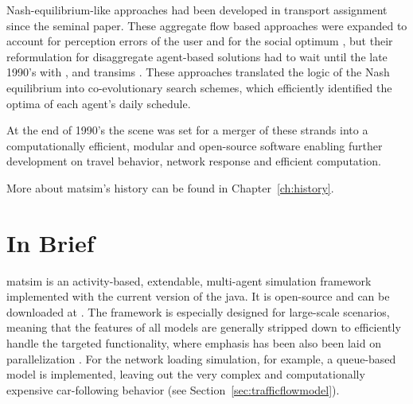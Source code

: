 



Nash-equilibrium-like approaches had been developed in transport assignment since the seminal \citet[][]{Wardrop_PICE_1952} paper. These aggregate flow based approaches were expanded to account for perception errors of the user and for the social optimum \citep[see][]{DaganzoSheffi_TransScience_1977}, but their reformulation for disaggregate agent-based solutions had to wait until the late 1990’s with \citet{Nagel1995phd,Nagel1996NRW, Gawron_IJMPC_1998}, and \gls{transims} \citep[][]{SmithEtc1995TRANSIMSSeattle}. These approaches translated the logic of the Nash equilibrium
into co-evolutionary search schemes, which efficiently identified the optima of each agent’s daily schedule.

At the end of 1990’s the scene was set for a merger of these strands into a computationally efficient, modular and open-source software enabling further development on travel behavior, network response and efficient computation. 

%

More about \gls{matsim}'s history can be found in Chapter~\ref{ch:history}.

\section{In Brief}
\label{sec:inbrief}
\gls{matsim} is an activity-based, extendable, multi-agent simulation \gls{framework} 
implemented with the current version of the \gls{java}. It is open-source and can be downloaded at \citep[][]{MATSIM_Webpage_2015, SourceForge_Webpage_2015}. The \gls{framework} is especially designed for large-scale scenarios, meaning that the features of all models are generally stripped down to efficiently handle the targeted functionality, where emphasis has been also been laid on parallelization \citep[e.g.,][]{Dobler_TechRep_IVT_2011, Charypar_PhDThesis_2008}. For the network loading simulation, for example, a queue-based model is implemented, leaving out the very complex and computationally expensive car-following behavior (see Section~\ref{sec:trafficflowmodel}).

